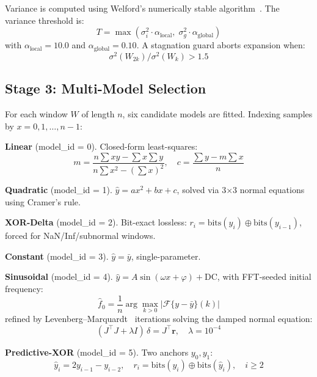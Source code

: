 \documentclass[runningheads]{llncs}
\begin{document}
Variance is computed using Welford's numerically stable algorithm~\cite{welford1962}. The variance threshold is:
\begin{equation}
\label{eq:thresh}
T = \max(\sigma^2_i \cdot \alpha_{\text{local}},\; \sigma^2_g \cdot \alpha_{\text{global}})
\end{equation}
with $\alpha_{\text{local}} = 10.0$ and $\alpha_{\text{global}} = 0.10$. A stagnation guard aborts expansion when:
\begin{equation}
\label{eq:stag}
\sigma^2(W_{2k}) / \sigma^2(W_k) > 1.5
\end{equation}

\subsection{Stage 3: Multi-Model Selection}

For each window $W$ of length $n$, six candidate models are fitted. Indexing samples by $x = 0, 1, \ldots, n{-}1$:

\textbf{Linear} (model\_id = 0). Closed-form least-squares:
\begin{equation}
\label{eq:linear}
m = \frac{n\sum xy - \sum x \sum y}{n\sum x^2 - (\sum x)^2}, \quad c = \frac{\sum y - m\sum x}{n}
\end{equation}

\textbf{Quadratic} (model\_id = 1). $\hat{y} = ax^2 + bx + c$, solved via 3$\times$3 normal equations using Cramer's rule.

\textbf{XOR-Delta} (model\_id = 2). Bit-exact lossless: $r_i = \text{bits}(y_i) \oplus \text{bits}(y_{i-1})$, forced for NaN/Inf/subnormal windows.

\textbf{Constant} (model\_id = 3). $\hat{y} = \bar{y}$, single-parameter.

\textbf{Sinusoidal} (model\_id = 4). $\hat{y} = A\sin(\omega x + \varphi) + \text{DC}$, with FFT-seeded initial frequency:
\begin{equation}
\label{eq:fft}
\hat{f}_0 = \frac{1}{n} \arg\max_{k>0} |\mathcal{F}\{y - \bar{y}\}(k)|
\end{equation}
refined by Levenberg--Marquardt~\cite{marquardt1963} iterations solving the damped normal equation:
\begin{equation}
\label{eq:lm}
(J^\top J + \lambda I)\,\delta = J^\top \mathbf{r}, \quad \lambda = 10^{-4}
\end{equation}

\textbf{Predictive-XOR} (model\_id = 5). Two anchors $y_0, y_1$:
\begin{equation}
\label{eq:pxor}
\hat{y}_i = 2y_{i-1} - y_{i-2}, \quad r_i = \text{bits}(y_i) \oplus \text{bits}(\hat{y}_i), \quad i \ge 2
\end{equation}
\end{document}
